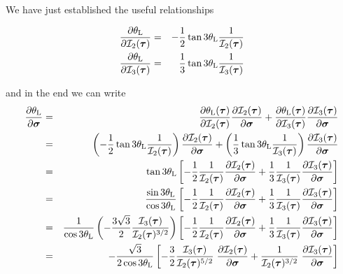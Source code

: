 We have just established the useful relationships
\begin{mdframed}[backgroundcolor=blue!5]
\begin{eqnarray}
\frac{\partial \theta_{\rm L}}{\partial {\cal I}_2(\bm\tau)}
&=& -\frac12 \tan 3\theta_{\rm L} \frac{1}{ {\cal I}_2(\bm\tau)}  \label{eq:dthetadI2} \\
\frac{\partial \theta_{\rm L}}{\partial {\cal I}_3(\bm\tau)}
&=& \frac13 \tan 3\theta_{\rm L} \frac{1}{{\cal I}_3(\bm\tau)}   \label{eq:dthetadI2}
\end{eqnarray}
\end{mdframed}
and in the end we can write
\begin{eqnarray}
\frac{\partial \theta_{\rm L}}{\partial \bm\sigma}
&=&
\frac{\partial \theta_{\rm L}(\bm\tau)}{\partial {\cal I}_2(\bm\tau)}
\frac{\partial {\cal I}_2(\bm\tau)}{\partial \bm\sigma}
+
\frac{\partial \theta_{\rm L}(\bm\tau)}{\partial {\cal I}_3(\bm\tau)}
\frac{\partial {\cal I}_3(\bm\tau)}{\partial \bm\sigma} \nonumber\\
&=&
\left(-\frac12 \tan 3\theta_{\rm L} \frac{1}{ {\cal I}_2(\bm\tau)}  \right)
\frac{\partial {\cal I}_2(\bm\tau)}{\partial \bm\sigma} 
+ 
\left(\frac13 \tan 3\theta_{\rm L} \frac{1}{{\cal I}_3(\bm\tau)} \right)
 \frac{\partial  {\cal I}_3(\bm\tau)}{\partial \bm\sigma} \nonumber\\
&=&
\tan 3\theta_{\rm L}
\left[
-\frac12  \frac{1}{ {\cal I}_2(\bm\tau)}
 \frac{\partial {\cal I}_2(\bm\tau)}{\partial \bm\sigma} 
+ \frac13 \frac{1}{{\cal I}_3(\bm\tau)} 
 \frac{\partial {\cal I}_3(\bm\tau)}{\partial \bm\sigma} 
\right]
\nonumber\\
&=&
\frac{\sin 3\theta_{\rm L}}{\cos 3\theta_{\rm L}}
\left[
-\frac12  \frac{1}{ {\cal I}_2(\bm\tau)}
 \frac{\partial {\cal I}_2(\bm\tau)}{\partial \bm\sigma} 
+ \frac13 \frac{1}{{\cal I}_3(\bm\tau)} 
 \frac{\partial {\cal I}_3(\bm\tau)}{\partial \bm\sigma} 
\right]
\nonumber\\
&=&
\frac{1}{\cos 3\theta_{\rm L}}
\left(-\frac{3\sqrt{3}}{2}  \frac{{\cal I}_3(\bm\tau)}{{\cal I}_2(\bm\tau)^{3/2}} \right)
\left[
-\frac12  \frac{1}{ {\cal I}_2(\bm\tau)}
 \frac{\partial {\cal I}_2(\bm\tau)}{\partial \bm\sigma} 
+ \frac13 \frac{1}{{\cal I}_3(\bm\tau)} 
 \frac{\partial {\cal I}_3(\bm\tau)}{\partial \bm\sigma} 
\right]
\nonumber\\
&=&
-\frac{\sqrt{3}}{2\cos 3\theta_{\rm L}}
\left[
-\frac32  \frac{ {\cal I}_3(\bm\tau)   }{ {\cal I}_2(\bm\tau)^{5/2}}
\; \frac{\partial {\cal I}_2(\bm\tau)}{\partial \bm\sigma} 
+  \frac{1}{{\cal I}_2(\bm\tau)^{3/2}} 
\; \frac{\partial {\cal I}_3(\bm\tau)}{\partial \bm\sigma} 
\right]
\end{eqnarray}
